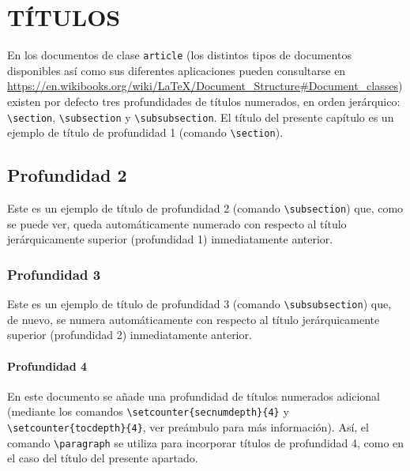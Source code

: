 \documentclass[a4paper, 11pt, spanish, twoside]{article}
\begin{document}

\newpage


\section{TÍTULOS} \label{sec:titulos}

En los documentos de clase \texttt{article} (los distintos tipos de documentos disponibles así como sus diferentes aplicaciones pueden consultarse en \url{https://en.wikibooks.org/wiki/LaTeX/Document_Structure#Document_classes}) existen por defecto tres profundidades de títulos numerados, en orden jerárquico: \texttt{\textbackslash section}, \texttt{\textbackslash subsection} y \texttt{\textbackslash subsubsection}. El título del presente capítulo es un ejemplo de título de profundidad 1 (comando \texttt{\textbackslash section}).


\subsection{Profundidad 2}

Este es un ejemplo de título de profundidad 2 (comando \texttt{\textbackslash subsection}) que, como se puede ver, queda automáticamente numerado con respecto al título jerárquicamente superior (profundidad 1) inmediatamente anterior.


\subsubsection{Profundidad 3}

Este es un ejemplo de título de profundidad 3 (comando \texttt{\textbackslash subsubsection}) que, de nuevo, se numera automáticamente con respecto al título jerárquicamente superior (profundidad 2) inmediatamente anterior.


\paragraph{Profundidad 4}

En este documento se añade una profundidad de títulos numerados adicional (mediante los comandos \texttt{\textbackslash setcounter\{secnumdepth\}\{4\}} y \texttt{\textbackslash setcounter\{tocdepth\}\{4\}}, ver preámbulo para más información). Así, el comando \texttt{\textbackslash paragraph} se utiliza para incorporar títulos de profundidad 4, como en el caso del título del presente apartado. 
\end{document}

